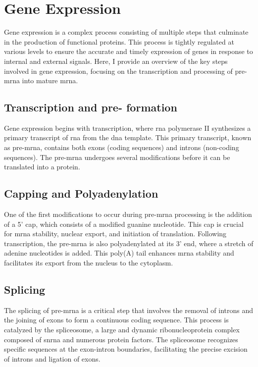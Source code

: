 \section{Gene Expression}
\label{sec:gene_expression}

Gene expression is a complex process consisting of multiple steps that
culminate in the production of functional proteins.
This process is tightly regulated at various levels to ensure the accurate and
timely expression of genes in response to internal and external signals.
Here, I provide an overview of the key steps involved in gene expression,
focusing on the transcription and processing of pre-\gls{mrna} into mature
\gls{mrna}.

\subsection{Transcription and pre- formation}
Gene expression begins with transcription, where \gls{rna} polymerase II
synthesizes a primary transcript of \gls{rna} from the \gls{dna} template.
This primary transcript, known as pre-\gls{mrna}, contains both exons (coding
sequences) and introns (non-coding sequences)\supercite{lee_mechanisms_2015}.
The pre-\gls{mrna} undergoes several modifications before it can be translated
into a protein.

\subsection{Capping and Polyadenylation}
One of the first modifications to occur during pre-\gls{mrna} processing is the
addition of a 5' cap, which consists of a modified guanine nucleotide.
This cap is crucial for \gls{mrna} stability, nuclear export, and initiation of
translation\supercite{topisirovic_cap_2011}.
Following transcription, the pre-\gls{mrna} is also polyadenylated at its 3'
end, where a stretch of adenine nucleotides is added.
This poly(A) tail enhances \gls{mrna} stability and facilitates its export from
the nucleus to the cytoplasm\supercite{passmore_roles_2022}.

\subsection{Splicing}
The splicing of pre-\gls{mrna} is a critical step that involves the removal of
introns and the joining of exons to form a continuous coding sequence.
This process is catalyzed by the spliceosome, a large and dynamic
ribonucleoprotein complex composed of \gls{snrna} and numerous protein
factors\supercite{lee_mechanisms_2015}.
The spliceosome recognizes specific sequences at the exon-intron boundaries,
facilitating the precise excision of introns and ligation of
exons\supercite{wang_splicing_2008}.

